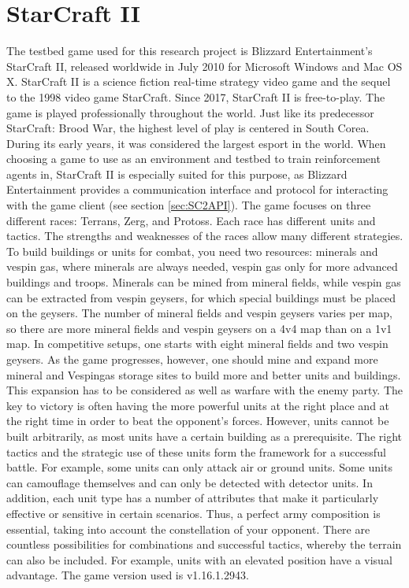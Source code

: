 \documentclass[12pt,a4paper]{article}
\begin{document}
\section{StarCraft II}
The testbed game used for this research project is Blizzard Entertainment's StarCraft II, released worldwide in July 2010 for Microsoft Windows and Mac OS X. StarCraft II is a science fiction real-time strategy video game and the sequel to the 1998 video game StarCraft. Since 2017, StarCraft II is free-to-play. The game is played professionally throughout the world. Just like its predecessor StarCraft: Brood War, the highest level of play is centered in South Corea. During its early years, it was considered the largest esport in the world.
When choosing a game to use as an environment and testbed to train reinforcement agents in, StarCraft II is especially suited for this purpose, as Blizzard Entertainment provides a communication interface and protocol for interacting with the game client (see section \ref{sec:SC2API}).
The game focuses on three different races: Terrans, Zerg, and Protoss. Each race has different units and tactics. The strengths and weaknesses of the races allow many different strategies.
To build buildings or units for combat, you need two resources: minerals and vespin gas, where minerals are always needed, vespin gas only for more advanced buildings and troops. Minerals can be mined from mineral fields, while vespin gas can be extracted from vespin geysers, for which special buildings must be placed on the geysers. The number of mineral fields and vespin geysers varies per map, so there are more mineral fields and vespin geysers on a 4v4 map than on a 1v1 map.
In competitive setups, one starts with eight mineral fields and two vespin geysers. As the game progresses, however, one should mine and expand more mineral and Vespingas storage sites to build more and better units and buildings. This expansion has to be considered as well as warfare with the enemy party.
The key to victory is often having the more powerful units at the right place and at the right time in order to beat the opponent's forces.
However, units cannot be built arbitrarily, as most units have a certain building as a prerequisite. The right tactics and the strategic use of these units form the framework for a successful battle. For example, some units can only attack air or ground units. Some units can camouflage themselves and can only be detected with detector units. In addition, each unit type has a number of attributes that make it particularly effective or sensitive in certain scenarios. Thus, a perfect army composition is essential, taking into account the constellation of your opponent. There are countless possibilities for combinations and successful tactics, whereby the terrain can also be included. For example, units with an elevated position have a visual advantage.
The game version used is v1.16.1.2943.
\end{document}
